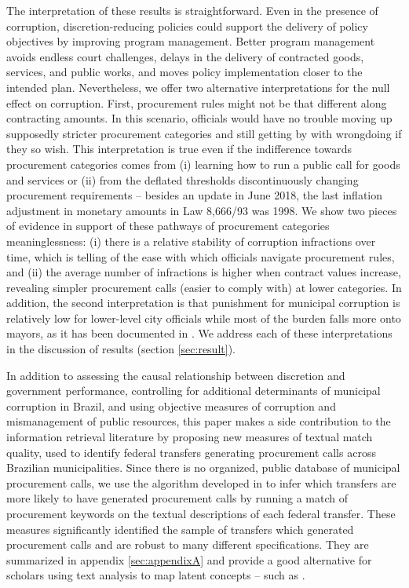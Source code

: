 \documentclass[11pt]{article}
\begin{document}
The interpretation of these results is straightforward. Even in the presence of corruption, discretion-reducing policies could support the delivery of policy objectives by improving program management. Better program management avoids endless court challenges, delays in the delivery of contracted goods, services, and public works, and moves policy implementation closer to the intended plan. Nevertheless, we offer two alternative interpretations for the null effect on corruption. First, procurement rules might not be that different along contracting amounts. In this scenario, officials would have no trouble moving up supposedly stricter procurement categories and still getting by with wrongdoing if they so wish. This interpretation is true even if the indifference towards procurement categories comes from (i) learning how to run a public call for goods and services or (ii) from the deflated thresholds discontinuously changing procurement requirements -- besides an update in June 2018, the last inflation adjustment in monetary amounts in Law 8,666/93 was 1998. We show two pieces of evidence in support of these pathways of procurement categories meaninglessness: (i) there is a relative stability of corruption infractions over time, which is telling of the ease with which officials navigate procurement rules, and (ii) the average number of infractions is higher when contract values increase, revealing simpler procurement calls (easier to comply with) at lower categories. In addition, the second interpretation is that punishment for municipal corruption is relatively low for lower-level city officials while most of the burden falls more onto mayors, as it has been documented in \citet{AvisGovernmentAuditsReduce2018}. We address each of these interpretations in the discussion of results (section \ref{sec:result}).

In addition to assessing the causal relationship between discretion and government performance, controlling for additional determinants of municipal corruption in Brazil, and using objective measures of corruption and mismanagement of public resources, this paper makes a side contribution to the information retrieval literature by proposing new measures of textual match quality, used to identify federal transfers generating procurement calls across Brazilian municipalities. Since there is no organized, public database of municipal procurement calls, we use the algorithm developed in \citet{AssumpcaotextfindDataDrivenText2018} to infer which transfers are more likely to have generated procurement calls by running a match of procurement keywords on the textual descriptions of each federal transfer. These measures significantly identified the sample of transfers which generated procurement calls and are robust to many different specifications. They are summarized in appendix \ref{sec:appendixA} and provide a good alternative for scholars using text analysis to map latent concepts -- such as \citet{LichandCorruptionGoodYour2017}.
\end{document}
